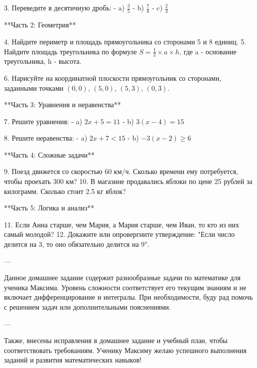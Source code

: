 \documentclass{article}
\begin{document}
3. Переведите в десятичную дробь:
   - a) \( \frac{3}{5} \)
   - b) \( \frac{7}{8} \)
   - c) \( \frac{2}{3} \)

**Часть 2: Геометрия**

4. Найдите периметр и площадь прямоугольника со сторонами 5 и 8 единиц.
5. Найдите площадь треугольника по формуле \(S = \frac{1}{2} \times a \times h\), где a - основание треугольника, h - высота.

6. Нарисуйте на координатной плоскости прямоугольник со сторонами, заданными точками \((0,0)\), \((5,0)\), \((5,3)\), \((0,3)\).

**Часть 3: Уравнения и неравенства**

7. Решите уравнения:
   - a) \(2x + 5 = 11\)
   - b) \(3(x - 4) = 15\)

8. Решите неравенства:
   - a) \(2x + 7 < 15\)
   - b) \(-3(x - 2) \geq 6\)

**Часть 4: Сложные задачи**

9. Поезд движется со скоростью 60 км/ч. Сколько времени ему потребуется, чтобы проехать 300 км?
10. В магазине продавались яблоки по цене 25 рублей за килограмм. Сколько стоит 2.5 кг яблок?

**Часть 5: Логика и анализ**

11. Если Анна старше, чем Мария, а Мария старше, чем Иван, то кто из них самый молодой?
12. Докажите или опровергните утверждение: "Если число делится на 3, то оно обязательно делится на 9".

---

Данное домашнее задание содержит разнообразные задачи по математике для ученика Максима. Уровень сложности соответствует его текущим знаниям и не включает дифференцирование и интегралы. При необходимости, буду рад помочь с решением задач или дополнительными пояснениями.

---

Также, внесены исправления в домашнее задание и учебный план, чтобы соответствовать требованиям. Ученику Максиму желаю успешного выполнения заданий и развития математических навыков!
\end{document}

